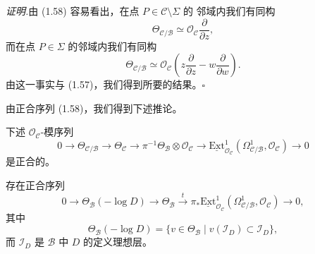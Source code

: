 \noindent\textit{证明.}\quad 由 (1.58) 容易看出，在点 $P\in\mathcal{C}\setminus\Sigma$ 的
邻域内我们有同构
\[
\Theta_{\mathcal{C}/\mathcal{B}}\simeq
\mathcal{O}_{\mathcal{C}}\frac{\partial}{\partial z},
\]
而在点 $P\in\Sigma$ 的邻域内我们有同构
\begin{equation}
\Theta_{\mathcal{C}/\mathcal{B}}\simeq
\mathcal{O}_{\mathcal{C}}\left(z\frac{\partial}{\partial z}
-w\frac{\partial}{\partial w}\right). \tag{1.61}
\end{equation}
由这一事实与 (1.57)，我们得到所要的结果。\hfill$\square$

由正合序列 (1.58)，我们得到下述推论。

\begin{corollary}[1.34]
下述 $\mathcal{O}_{\mathcal{C}}$-模序列
\[
0\to\Theta_{\mathcal{C}/\mathcal{B}}\to\Theta_{\mathcal{C}}
\to\pi^{-1}\Theta_{\mathcal{B}}\otimes\mathcal{O}_{\mathcal{C}}
\to\underline{\mathrm{Ext}}^1_{\mathcal{O}_{\mathcal{C}}}
(\Omega^1_{\mathcal{C}/\mathcal{B}},\mathcal{O}_{\mathcal{C}})\to 0
\]
是正合的。
\end{corollary}


\begin{lemma}[1.35]
存在正合序列
\begin{equation}
0\to\Theta_{\mathcal{B}}(-\log D)\to\Theta_{\mathcal{B}}
\xrightarrow{\ t\ }\pi_*\underline{\mathrm{Ext}}^1_{\mathcal{O}_{\mathcal{C}}}
(\Omega^1_{\mathcal{C}/\mathcal{B}},\mathcal{O}_{\mathcal{C}})\to 0,
\tag{1.62}
\end{equation}
其中
\[
\Theta_{\mathcal{B}}(-\log D)=\{v\in\Theta_{\mathcal{B}}\mid
v(\mathcal{I}_D)\subset\mathcal{I}_D\},
\]
而 $\mathcal{I}_D$ 是 $\mathcal{B}$ 中 $D$ 的定义理想层。
\end{lemma}

